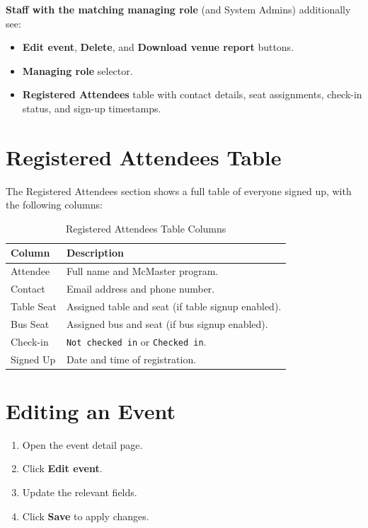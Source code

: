 \documentclass[12pt, twoside]{report}
\newcommand{\uielem}[1]{\textbf{#1}}
\begin{document}
\textbf{Staff with the matching managing role} (and System Admins) additionally see:
\begin{itemize}
  \item \uielem{Edit event}, \uielem{Delete}, and
        \uielem{Download venue report} buttons.
  \item \uielem{Managing role} selector.
  \item \uielem{Registered Attendees} table with contact details, seat
        assignments, check-in status, and sign-up timestamps.
\end{itemize}

\section{Registered Attendees Table}

The Registered Attendees section shows a full table of everyone signed up,
with the following columns:

\begin{table}[H]
  \centering
  \caption{Registered Attendees Table Columns}
  \begin{tabular}{@{} p{3cm} p{10cm} @{}}
    \toprule
    \textbf{Column} & \textbf{Description} \\
    \midrule
    Attendee    & Full name and McMaster program. \\
    Contact     & Email address and phone number. \\
    Table Seat  & Assigned table and seat (if table signup enabled). \\
    Bus Seat    & Assigned bus and seat (if bus signup enabled). \\
    Check-in    & \texttt{Not checked in} or \texttt{Checked in}. \\
    Signed Up   & Date and time of registration. \\
    \bottomrule
  \end{tabular}
\end{table}

\section{Editing an Event}

\begin{enumerate}
  \item Open the event detail page.
  \item Click \uielem{Edit event}.
  \item Update the relevant fields.
  \item Click \uielem{Save} to apply changes.
\end{enumerate}
\end{document}
